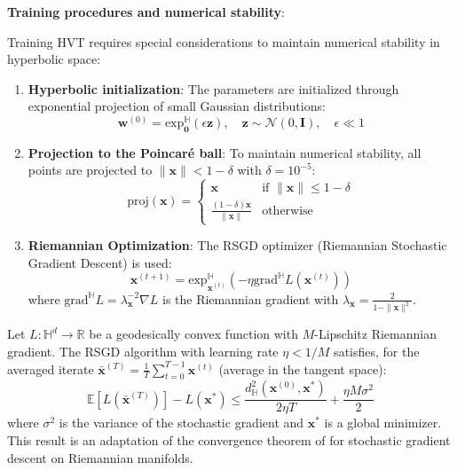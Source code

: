 \textbf{Training procedures and numerical stability}:

Training HVT requires special considerations to maintain numerical stability in hyperbolic space:

\begin{enumerate}
    \item \textbf{Hyperbolic initialization}: The parameters are initialized through exponential projection of small Gaussian distributions:
    \begin{equation}
    \mathbf{w}^{(0)} = \text{exp}_{\mathbf{0}}^{\mathbb{H}}(\epsilon \mathbf{z}), \quad \mathbf{z} \sim \mathcal{N}(0, \mathbf{I}), \quad \epsilon \ll 1
    \end{equation}

    \item \textbf{Projection to the Poincaré ball}: To maintain numerical stability, all points are projected to $\|\mathbf{x}\| < 1 - \delta$ with $\delta = 10^{-5}$:
    \begin{equation}
    \text{proj}(\mathbf{x}) = \begin{cases}
    \mathbf{x} & \text{if } \|\mathbf{x}\| \leq 1 - \delta \\
    \frac{(1-\delta)\mathbf{x}}{\|\mathbf{x}\|} & \text{otherwise}
    \end{cases}
    \end{equation}

    \item \textbf{Riemannian Optimization}: The RSGD optimizer (Riemannian Stochastic Gradient Descent) is used:
    \begin{equation}
    \mathbf{x}^{(t+1)} = \text{exp}_{\mathbf{x}^{(t)}}^{\mathbb{H}}\left(-\eta \text{grad}^{\mathbb{H}} L(\mathbf{x}^{(t)})\right)
    \end{equation}
    where $\text{grad}^{\mathbb{H}} L = \lambda_{\mathbf{x}}^{-2} \nabla L$ is the Riemannian gradient with $\lambda_{\mathbf{x}} = \frac{2}{1-\|\mathbf{x}\|^2}$.
\end{enumerate}

\begin{theorem}\label{thm:hvt_convergence}
Let $L: \mathbb{H}^d \to \mathbb{R}$ be a geodesically convex function with $M$-Lipschitz Riemannian gradient. The RSGD algorithm with learning rate $\eta < 1/M$ satisfies, for the averaged iterate $\bar{\mathbf{x}}^{(T)} = \frac{1}{T}\sum_{t=0}^{T-1} \mathbf{x}^{(t)}$ (average in the tangent space):
\begin{equation}
\mathbb{E}[L(\bar{\mathbf{x}}^{(T)})] - L(\mathbf{x}^*) \leq \frac{d_{\mathbb{H}}^2(\mathbf{x}^{(0)}, \mathbf{x}^*)}{2\eta T} + \frac{\eta M \sigma^2}{2}
\end{equation}
where $\sigma^2$ is the variance of the stochastic gradient and $\mathbf{x}^*$ is a global minimizer. This result is an adaptation of the convergence theorem of \citet{bonnabel2013stochastic} for stochastic gradient descent on Riemannian manifolds.
\end{theorem}

